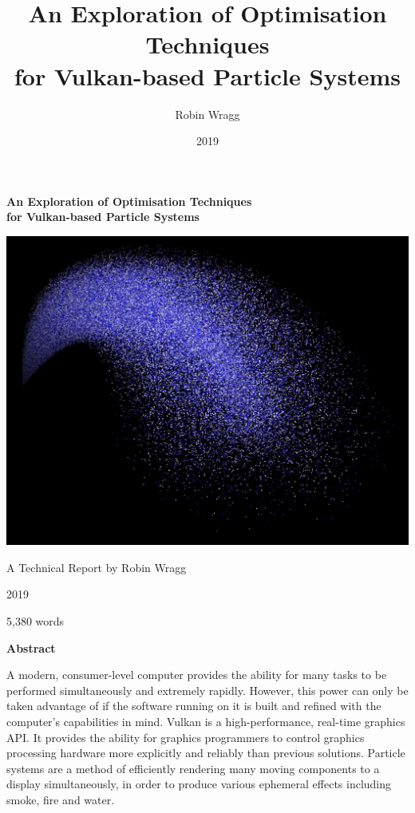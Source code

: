 \documentclass[11pt, a4paper, twocolumn]{article}
\begin{document}
\onecolumn

\title{\sffamily\bfseries An Exploration of Optimisation Techniques\\for Vulkan-based Particle Systems}
\author{Robin Wragg}
\date{2019}

\begin{center}

\vspace*{1cm}

{\sffamily\bfseries\huge An Exploration of Optimisation Techniques\\for Vulkan-based Particle Systems}

\vspace{1cm}

\includegraphics[width=14cm]{particles}

\vspace{1cm}

{\Large A Technical Report by Robin Wragg}

\vspace{0.4cm}

{\Large 2019}

\vspace{0.4cm}

{\Large 5,380 words}

\vspace{1cm}

{\sffamily\bfseries\LARGE Abstract}
\end{center}

A modern, consumer-level computer provides the ability for many tasks to be performed simultaneously and extremely rapidly. However, this power can only be taken advantage of if the software running on it is built and refined with the computer's capabilities in mind. Vulkan is a high-performance, real-time graphics API. It provides the ability for graphics programmers to control graphics processing hardware more explicitly and reliably than previous solutions. Particle systems are a method of efficiently rendering many moving components to a display simultaneously, in order to produce various ephemeral effects including smoke, fire and water.
\end{document}
